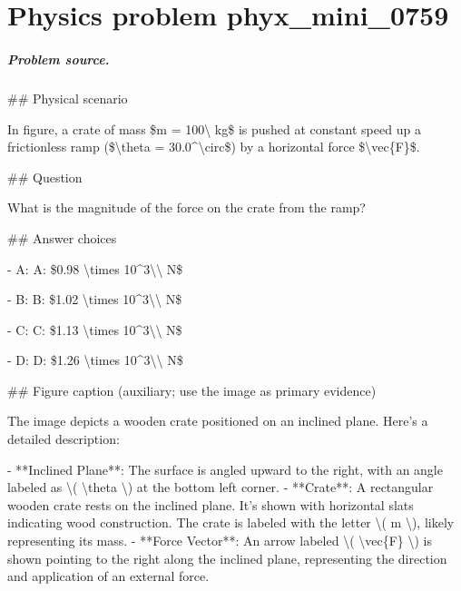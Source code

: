 
\chapter{Physics problem phyx\_mini\_0759}
\label{ch:PhyXMiniProblems_problem_phyx_mini_0759}

\paragraph{Problem source.}
\#\# Physical scenario

In figure, a crate of mass \$m = 100\textbackslash{} kg\$ is pushed at constant speed up a frictionless ramp (\$\textbackslash{}theta = 30.0\textasciicircum{}\textbackslash{}circ\$) by a horizontal force \$\textbackslash{}vec\{F\}\$.

\#\# Question

What is the magnitude of the force on the crate from the ramp?

\#\# Answer choices

- A: A: \$0.98 \textbackslash{}times 10\textasciicircum{}3\textbackslash{}\textbackslash{} N\$

- B: B: \$1.02 \textbackslash{}times 10\textasciicircum{}3\textbackslash{}\textbackslash{} N\$

- C: C: \$1.13 \textbackslash{}times 10\textasciicircum{}3\textbackslash{}\textbackslash{} N\$

- D: D: \$1.26 \textbackslash{}times 10\textasciicircum{}3\textbackslash{}\textbackslash{} N\$

\#\# Figure caption (auxiliary; use the image as primary evidence)

The image depicts a wooden crate positioned on an inclined plane. Here's a detailed description:

- **Inclined Plane**: The surface is angled upward to the right, with an angle labeled as \textbackslash{}( \textbackslash{}theta \textbackslash{}) at the bottom left corner.
- **Crate**: A rectangular wooden crate rests on the inclined plane. It’s shown with horizontal slats indicating wood construction. The crate is labeled with the letter \textbackslash{}( m \textbackslash{}), likely representing its mass.
- **Force Vector**: An arrow labeled \textbackslash{}( \textbackslash{}vec\{F\} \textbackslash{}) is shown pointing to the right along the inclined plane, representing the direction and application of an external force.
  

